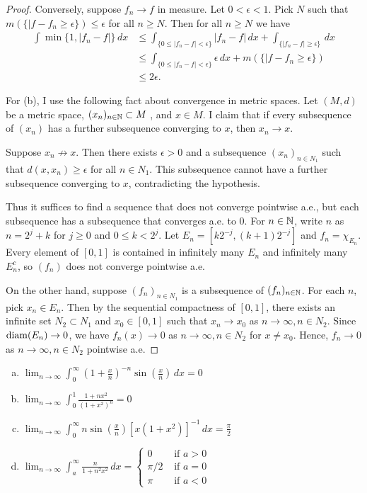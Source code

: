 \documentclass{article}
\begin{document}
\begin{proof}
Conversely, suppose $f_n \to f$ in measure.  Let $0 < \epsilon < 1$. Pick $N$ such that $m( \{ |f - f_n \ge \epsilon \})  \le \epsilon$ for all $n \ge N$.  Then for all $n \ge N$ we have
\begin{align*}
\int \min \{1, |f_n - f|\} \, dx & \le  \int_{\{ 0 \le |f_n - f| < \epsilon \}} |f_n - f| \, dx + \int_{\{  |f_n - f| \ge \epsilon \}} \, dx
\\ & \le \int_{\{ 0 \le |f_n - f| < \epsilon \}} \epsilon \, dx + m( \{ |f - f_n \ge \epsilon \}) 
\\ & \le 2 \epsilon.
\end{align*}

For (b), I use the following fact about convergence in metric spaces. Let $(M, d)$ be a metric space, $(x_n)_{n \in \mathbb{N}} \subset M$ , and $x \in M$.  I claim that if every subsequence of $(x_n)$ has a further subsequence converging to $x$, then $x_n \to x$.  

Suppose $x_n \not \to x$.  Then there exists $\epsilon > 0$ and a subsequence $(x_n)_{n \in N_1}$ such that $d(x, x_n) \ge \epsilon$ for all $n \in N_1$. This subsequence cannot have a further subsequence converging to $x$, contradicting the hypothesis.

Thus it suffices to find a sequence that does not converge pointwise a.e., but each subsequence has a subsequence that converges a.e. to $0$.  For $n \in \mathbb{N}$, write $n$ as $n = 2^j + k$ for $j \ge 0$ and $0 \le k < 2^j$.  Let $E_n = [k 2^{-j}, (k+1) 2^{-j}]$ and $f_n = \chi_{E_n}$.  Every element of $[0,1]$ is contained in infinitely many $E_n$ and infinitely many $E_n^c$, so $(f_n)$ does not converge pointwise a.e.  

On the other hand, suppose $(f_n)_{n \in N_1}$ is a subsequence of $(f_n)_{n \in \mathbb{N}}$.  For each $n$, pick $x_n \in E_n$.  Then by the sequential compactness of $[0,1]$, there exists an infinite set $N_2 \subset N_1$ and $x_0 \in [0,1]$ such that $x_n \to x_0$ as $n \to \infty, n \in N_2$. Since $\mathrm{diam}(E_n) \to 0$, we have $f_n(x) \to 0$ as $n \to \infty, n \in N_2$ for $x \neq x_0$.  Hence, $f_n \to 0$ as $n \to \infty, n \in N_2$ pointwise a.e.
\end{proof}


\begin{enumerate}[(a)]
\item $\displaystyle \lim_{n\to \infty} \int_0^\infty \left( 1 + \frac x n \right)^{-n} \sin \left(\frac x n \right) \, dx = 0$
\item $\displaystyle \lim_{n \to \infty} \int_0^1 \frac{1 + n x^2} {(1 + x^2)^n} = 0$
\item $ \displaystyle \lim_{n \to \infty} \int_0^\infty n \sin \left( \frac x n \right) [x(1+x^2)]^{-1} \, dx = \frac \pi 2$
\item $ \displaystyle \lim_{n \to \infty} \int_a^\infty \frac n {1 + n^2 x^2} \, dx= \left\{
\begin{array}{ll}
   0 & \text{ if } a > 0
\\ \pi/2 & \text{ if } a = 0
\\ \pi  & \text{ if } a < 0
\end{array} \right.
$
\end{enumerate}
\end{document}
